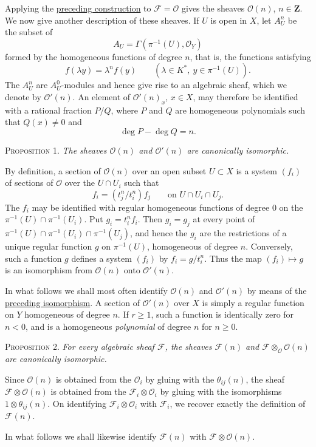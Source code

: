 Applying the \hyperref[fac:III:2:no:54:construction:twist]{preceding construction} to $\mathcal{F}=\mathcal{O}$ gives the
sheaves $\mathcal{O}(n)$, $n\in\mathbf{Z}$. We now give another description
of these sheaves. If $U$ is open in $X$, let $A_U^n$ be the subset of
\[
A_U=\Gamma(\pi^{-1}(U),\mathcal{O}_Y)
\]
formed by the homogeneous functions of degree $n$, that is, the functions
satisfying
\label{fac:III:2:no:54:formula:homogeneous-function}
\[
f(\lambda y)=\lambda^n f(y)
\qquad(\lambda\in K^*,\ y\in\pi^{-1}(U)).
\]
The $A_U^n$ are $A_U^0$-modules and hence give rise to an algebraic sheaf,
which we denote by $\mathcal{O}'(n)$. An element of
$\mathcal{O}'(n)_x$, $x\in X$, may therefore be identified with a rational
fraction $P/Q$, where $P$ and $Q$ are homogeneous polynomials such that
$Q(x)\neq0$ and
\[
\deg P-\deg Q=n.
\]

\label{fac:III:2:prop:1}
\textsc{Proposition 1.}
\textit{The sheaves $\mathcal{O}(n)$ and $\mathcal{O}'(n)$ are canonically
isomorphic.}

By definition, a section of $\mathcal{O}(n)$ over an open subset $U\subset X$
is a system $(f_i)$ of sections of $\mathcal{O}$ over the $U\cap U_i$ such
that
\[
f_i=(t_j^n/t_i^n)f_j
\qquad\text{on }U\cap U_i\cap U_j.
\]
The $f_i$ may be identified with regular homogeneous functions of degree
$0$ on the $\pi^{-1}(U)\cap\pi^{-1}(U_i)$. Put $g_i=t_i^n f_i$. Then
$g_i=g_j$ at every point of
$\pi^{-1}(U)\cap\pi^{-1}(U_i)\cap\pi^{-1}(U_j)$, and hence the $g_i$ are
the restrictions of a unique regular function $g$ on $\pi^{-1}(U)$,
homogeneous of degree $n$. Conversely, such a function $g$ defines a system
$(f_i)$ by $f_i=g/t_i^n$. Thus the map $(f_i)\mapsto g$ is an isomorphism
from $\mathcal{O}(n)$ onto $\mathcal{O}'(n)$.

In what follows we shall most often identify $\mathcal{O}(n)$ and
$\mathcal{O}'(n)$ by means of the \hyperref[fac:III:2:prop:1]{preceding isomorphism}. A section of
$\mathcal{O}'(n)$ over $X$ is simply a regular function on $Y$ homogeneous
of degree $n$. If $r\geq1$, such a function is identically zero for $n<0$,
and is a homogeneous \textit{polynomial} of degree $n$ for $n\geq0$.

\label{fac:III:2:prop:2}
\textsc{Proposition 2.}
\textit{For every algebraic sheaf $\mathcal{F}$, the sheaves
$\mathcal{F}(n)$ and
$\mathcal{F}\otimes_{\mathcal{O}}\mathcal{O}(n)$ are canonically
isomorphic.}

Since $\mathcal{O}(n)$ is obtained from the $\mathcal{O}_i$ by gluing with
the $\theta_{ij}(n)$, the sheaf
$\mathcal{F}\otimes\mathcal{O}(n)$ is obtained from the
$\mathcal{F}_i\otimes\mathcal{O}_i$ by gluing with the isomorphisms
$1\otimes\theta_{ij}(n)$. On identifying
$\mathcal{F}_i\otimes\mathcal{O}_i$ with $\mathcal{F}_i$, we recover exactly
the definition of $\mathcal{F}(n)$.

In what follows we shall likewise identify $\mathcal{F}(n)$ with
$\mathcal{F}\otimes\mathcal{O}(n)$.
